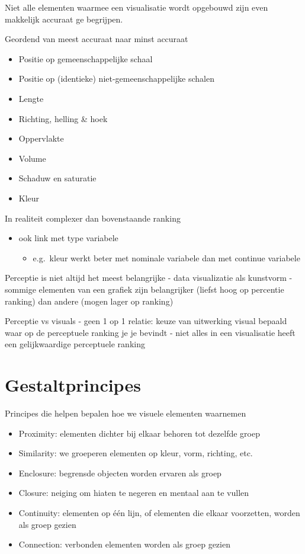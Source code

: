 \documentclass[]{tufte-book}
\providecommand{\tightlist}{%
  \setlength{\itemsep}{0pt}\setlength{\parskip}{0pt}}
\begin{document}
Niet alle elementen waarmee een visualisatie wordt opgebouwd zijn even makkelijk accuraat ge begrijpen.

Geordend van meest accuraat naar minst accuraat

\begin{itemize}
\tightlist
\item
  Positie op gemeenschappelijke schaal
\item
  Positie op (identieke) niet-gemeenschappelijke schalen
\item
  Lengte
\item
  Richting, helling \& hoek
\item
  Oppervlakte
\item
  Volume
\item
  Schaduw en saturatie
\item
  Kleur
\end{itemize}

In realiteit complexer dan bovenstaande ranking

\begin{itemize}
\tightlist
\item
  ook link met type variabele

  \begin{itemize}
  \tightlist
  \item
    e.g.~kleur werkt beter met nominale variabele dan met continue variabele
  \end{itemize}
\end{itemize}

Perceptie is niet altijd het meest belangrijke
- data visualizatie als kunstvorm
- sommige elementen van een grafiek zijn belangrijker (liefst hoog op percentie ranking) dan andere (mogen lager op ranking)

Perceptie vs visuals
- geen 1 op 1 relatie: keuze van uitwerking visual bepaald waar op de perceptuele ranking je je bevindt
- niet alles in een visualisatie heeft een gelijkwaardige perceptuele ranking

\hypertarget{gestaltprincipes}{%
\section{Gestaltprincipes}\label{gestaltprincipes}}

Principes die helpen bepalen hoe we visuele elementen waarnemen

\begin{itemize}
\tightlist
\item
  Proximity: elementen dichter bij elkaar behoren tot dezelfde groep
\item
  Similarity: we groeperen elementen op kleur, vorm, richting, etc.
\item
  Enclosure: begrensde objecten worden ervaren als groep
\item
  Closure: neiging om hiaten te negeren en mentaal aan te vullen
\item
  Continuity: elementen op één lijn, of elementen die elkaar voorzetten, worden als groep gezien
\item
  Connection: verbonden elementen worden als groep gezien
\end{itemize}
\end{document}
